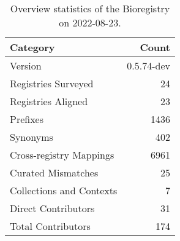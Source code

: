 \begin{table}
\centering
\caption{Overview statistics of the Bioregistry on 2022-08-23.}
\label{tab:bioregistry-summary}
\begin{tabular}{lr}
\toprule
                Category &      Count \\
\midrule
                 Version & 0.5.74-dev \\
     Registries Surveyed &         24 \\
      Registries Aligned &         23 \\
                Prefixes &       1436 \\
                Synonyms &        402 \\
 Cross-registry Mappings &       6961 \\
      Curated Mismatches &         25 \\
Collections and Contexts &          7 \\
     Direct Contributors &         31 \\
      Total Contributors &        174 \\
\bottomrule
\end{tabular}
\end{table}

